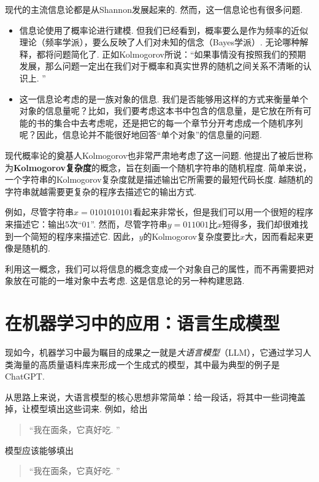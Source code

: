 \begin{remark}
现代的主流信息论都是从Shannon发展起来的. 然而，这一信息论也有很多问题. 
\begin{itemize}
    \item 信息论使用了概率论进行建模. 但我们已经看到，概率要么是作为频率的近似理论（频率学派），要么反映了人们对未知的信念（Bayes学派）. 无论哪种解释，都将问题简化了. 正如Kolmogorov所说：“如果事情没有按照我们的预期发展，那么问题一定出在我们对于概率和真实世界的随机之间关系不清晰的认识上. ”
    \item 这一信息论考虑的是一族对象的信息. 我们是否能够用这样的方式来衡量单个对象的信息量呢？比如，我们要考虑这本书中包含的信息量，是它放在所有可能的书的集合中去考虑呢，还是把它的每一个章节分开考虑成一个随机序列呢？因此，信息论并不能很好地回答“单个对象”的信息量的问题. 
\end{itemize}

现代概率论的奠基人Kolmogorov也非常严肃地考虑了这一问题. 他提出了被后世称为\textbf{Kolmogorov复杂度}的概念，旨在刻画一个随机字符串的随机程度. 简单来说，一个字符串的Kolmogorov复杂度就是描述输出它所需要的最短代码长度. 越随机的字符串就越需要更复杂的程序去描述它的输出方式. 

例如，尽管字符串$x=0101010101$看起来非常长，但是我们可以用一个很短的程序来描述它：输出5次“$01$”. 然而，尽管字符串$y=011001$比$x$短得多，我们却很难找到一个简短的程序来描述它. 因此，$y$的Kolmogorov复杂度要比$x$大，因而看起来更像是随机的.

利用这一概念，我们可以将信息的概念变成一个对象自己的属性，而不再需要把对象放在可能的一堆对象中去考虑. 这是信息论的另一种构建思路. 
\end{remark}

\section{在机器学习中的应用：语言生成模型}\label{sec:language-models}
现如今，机器学习中最为瞩目的成果之一就是\textit{大语言模型}（LLM），它通过学习人类海量的高质量语料库来形成一个生成式的模型，其中最为典型的例子是ChatGPT.

从思路上来说，大语言模型的核心思想非常简单：给一段话，将其中一些词掩盖掉，让模型填出这些词来. 例如，给出
\begin{quotation}
    “我在\light{[mask]}面条，它真好吃. ”    
\end{quotation}
模型应该能够填出
\begin{quotation}
    “我在面条，它真好吃. ”
\end{quotation}

